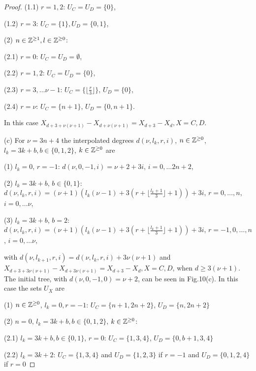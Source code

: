 \documentclass[10pt,a4paper]{amsart}
\begin{document}
\begin{proof}
    (1.1) $r=1, 2$: $U_{C}= U_{D}=\{ 0 \}$,
    
     (1.2) $r=3$: $U_{C}=\{ 1 \}, U_{D}=\{ 0,1 \}$,
    
     (2)  $n \in {\Bbb{Z}}^{\geq 1}, l \in {\Bbb{Z}}^{\geq 0}$: 
     
     (2.1) $r=0$: $U_{C}= U_{D}=\emptyset$,
    
 (2.2) $r=1, 2$: $U_{C}= U_{D}=\{0\}$, 
 
 (2.3) $r=3, \dots \nu-1$: $U_{C}=\{ \lfloor \frac{r}{3}  \rfloor\}$,  $U_{D}=\{0\}$,
 
 (2.4) $r=\nu$: $U_{C}=\{ n+1 \}$,  $U_{D}=\{0, n+1\}$.
    \bigskip\par 
In this case $X_{d+3+ \nu(\nu+1)}- X_{d+ \nu(\nu+1)} = X_{d+3}- X_{d}, X=C, D$. 

  \bigskip\par
(c) For $\nu= 3n+4$ the interpolated degrees $d(\nu, l_{k}, r, i)$, $n \in {\Bbb{Z}}^{\geq 0}$, $l_{k}=3k+b, b\in \{ 0, 1, 2 \}$, $k \in {\Bbb{Z}}^{\geq 0}$ are 
      \bigskip\par 
  (1) $l_{k}=0$, $r=-1$: $d(\nu, 0, -1, i)=\nu+2+3i$,  $i=0,\dots 2n+2$,
  
   (2) $l_{k}=3k+b$, $b\in \{ 0, 1 \}$: $d(\nu, l_{k}, r, i)=(\nu +1)(l_{k} (\nu-1)+3(r+\lfloor\frac{l_{k}+1}{3}\rfloor +1))+ 3i$, $r = 0, \dots, n$, $i=0,\dots \nu$,
   
     (3) $l_{k}=3k+b$, $b=2$: $d(\nu, l_{k}, r, i)=(\nu +1)(l_{k} (\nu-1)+3(r+\lfloor\frac{l_{k}+1}{3}\rfloor +1))+ 3i$, $r = -1, 0, \dots, n$, $i=0,\dots \nu$,

       \bigskip\par 
  \noindent            
 with  $d(\nu, l_{k+1}, r, i)=d(\nu, l_{k}, r, i)+ 3\nu(\nu+1)$ and $X_{d+3+3 \nu(\nu+1)}- X_{d+3 \nu(\nu+1)} = X_{d+3}- X_{d}, X=C, D$, when $d \geq 3(\nu+1)$. The initial tree, with $d(\nu, 0, -1, 0)=\nu+2$, can be seen in Fig.10(c). In this case the sets $U_{X}$ are  
       \bigskip\par 
 (1) $n \in {\Bbb{Z}}^{\geq 0}$, $ l_{k}=0, r=-1$:   $U_{C}=\{n+1, 2n+2\}$,  $U_{D}=\{n, 2n+2\}$ 
 
 (2) $n=0$,  $l_{k}=3k+b, b\in \{ 0, 1, 2 \}$, $k \in {\Bbb{Z}}^{\geq 0}$: 
 
  (2.1) $l_{k}=3k+b, b\in \{ 0, 1\}$, $r=0$: $U_{C}=\{1, 3, 4\}$, $U_{D}=\{0, b+1, 3, 4\}$ 
  
   (2.2) $l_{k}=3k+2$: $U_{C}=\{1, 3, 4\}$ and $U_{D}=\{1, 2, 3\}$ if $r = -1$ and $U_{D}=\{0, 1, 2, 4\}$ if $r = 0$
 

\end{proof}
\end{document}
